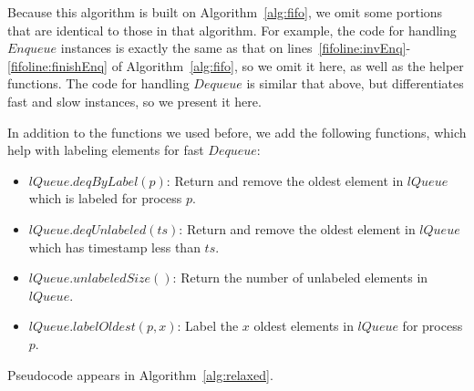 \documentclass[a4paper,anonymous,USenglish]{lipics-v2021}
\theoremstyle{definition}
\begin{document}
Because this algorithm is built on Algorithm~\ref{alg:fifo}, we omit some portions that are identical to those in that algorithm.  For example, the code for handling $Enqueue$ instances is exactly the same as that on lines~\ref{fifoline:invEnq}-\ref{fifoline:finishEnq} of Algorithm~\ref{alg:fifo}, so we omit it here, as well as the helper functions.  The code for handling $Dequeue$ is similar that above, but differentiates fast and slow instances, so we present it here. 

In addition to the functions we used before, we add the following functions, which help with labeling elements for fast $Dequeue$:
\begin{itemize}
\item $lQueue.deqByLabel(p)$: Return and remove the oldest element in $lQueue$ which is labeled for process $p$.
\item $lQueue.deqUnlabeled(ts)$: Return and remove the oldest element in $lQueue$ which has timestamp less than $ts$.
\item $lQueue.unlabeledSize()$: Return the number of unlabeled elements in $lQueue$.
\item $lQueue.labelOldest(p,x)$: Label the $x$ oldest elements in $lQueue$ for process $p$.
\end{itemize}
  Pseudocode appears in Algorithm~\ref{alg:relaxed}.
\end{document}
